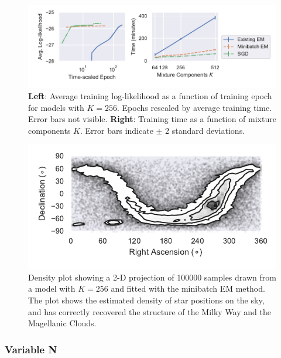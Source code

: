 \begin{figure}
  \centering
  \includegraphics[width=\textwidth]{figures/learning.pdf}
  \caption{\textbf{Left}: Average training log-likelihood as a function of training epoch for models with $K=256$. Epochs rescaled by average training time. Error bars not visible. \textbf{Right}: Training time as a function of mixture components $K$. Error bars indicate $\pm$ 2 standard deviations.}
  \label{fig:training}
\end{figure}

\begin{figure}
  \centering
  \includegraphics{figures/density.pdf}
  \caption{Density plot showing a 2-D projection of 100000 samples drawn from a model with $K=256$ and fitted with the minibatch EM method.
  The plot shows the estimated density of star positions on the sky, and has correctly recovered the structure of the Milky Way and the Magellanic Clouds.}
  \label{fig:projection}
\end{figure}

\subsubsection{Variable N}
